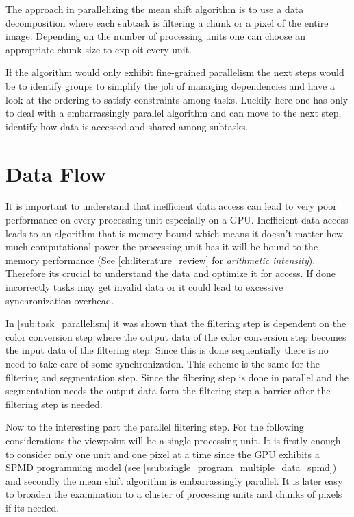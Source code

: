 The approach in parallelizing the mean shift algorithm is to use a data
decomposition where each subtask is filtering a chunk or a pixel of the entire
image. Depending on the number of processing units one can choose an appropriate
chunk size to exploit every unit.

If the algorithm would only exhibit fine-grained parallelism the next steps
would be to identify groups to simplify the job of managing dependencies and
have a look at the ordering to satisfy constraints among tasks. Luckily here one
has only to deal with a embarrassingly parallel algorithm and can move to the
next step, identify how data is accessed and shared among subtasks.

\section{Data Flow} %
\label{sec:data_flow}

It is important to understand that inefficient data access can lead to very poor
performance on every processing unit especially on a \gls{GPU}. Inefficient data
access leads to an algorithm that is memory bound which means it doesn't matter
how much computational power the processing unit has it will be bound to the
memory performance (See \autoref{ch:literature_review} for \emph{arithmetic
intensity}). Therefore its crucial to understand the data and optimize it for
access. If done incorrectly tasks may get invalid data or it could lead to
excessive synchronization overhead.

In \autoref{sub:task_parallelism} it was shown that the filtering step is
dependent on the color conversion step where the output data of the color
conversion step becomes the input data of the filtering step. Since this is done
sequentially there is no need to take care of some synchronization. This scheme
is the same for the filtering and segmentation step. Since the filtering step is
done in parallel and the segmentation needs the output data form the filtering
step a barrier after the filtering step is needed.

Now to the interesting part the parallel filtering step. For the following
considerations the viewpoint will be a single processing unit. It is firstly
enough to consider only one unit and one pixel at a time since the \gls{GPU}
exhibits a \gls{SPMD} programming model (see
\autoref{ssub:single_program_multiple_data_spmd}) and secondly the mean shift
algorithm is embarrassingly parallel. It is later easy to broaden the
examination to a cluster of processing units and chunks of pixels if its needed.

